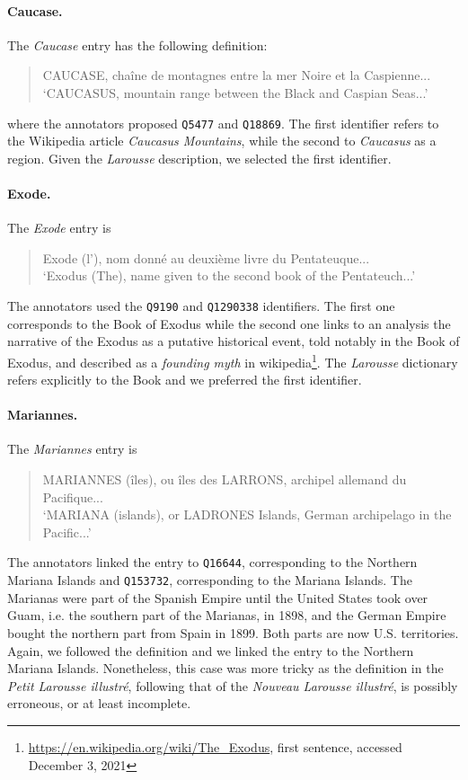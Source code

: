 \documentclass[10pt, a4paper]{article}
\begin{document}
\paragraph{Caucase.} The \textit{Caucase} entry has the following definition:
\begin{quote}
CAUCASE, chaîne de montagnes entre la mer Noire et la Caspienne...\\
`CAUCASUS, mountain range between the Black and Caspian Seas...'
\end{quote}
where the annotators proposed \verb=Q5477= and \verb=Q18869=. The first identifier refers to the Wikipedia article \textit{Caucasus Mountains}, while the second to \textit{Caucasus} as a region. Given the \textit{Larousse} description, we selected the first identifier.

\paragraph{Exode.} The \textit{Exode} entry is
\begin{quote}
Exode (l'), nom donné au deuxième livre du Pentateuque...\\
`Exodus (The), name given to the second book of the Pentateuch...'
\end{quote}
The annotators used the \verb=Q9190= and \verb=Q1290338= identifiers. The first one corresponds to the Book of Exodus while the second one links to an analysis the narrative of the Exodus as a putative historical event, told notably in the Book of Exodus, and described as a \textit{founding myth} in wikipedia\footnote{\url{https://en.wikipedia.org/wiki/The_Exodus}, first sentence, accessed December 3, 2021}. The \textit{Larousse} dictionary refers explicitly to the Book and we preferred the first identifier.

\paragraph{Mariannes.} The \textit{Mariannes} entry is
\begin{quote}
MARIANNES (îles), ou îles des LARRONS, archipel allemand du Pacifique...\\
`MARIANA (islands), or LADRONES Islands, German archipelago in the Pacific...' 
\end{quote}
The annotators linked the entry to \verb=Q16644=, corresponding to the Northern Mariana Islands and \verb=Q153732=, corresponding to the Mariana Islands. The Marianas were part of the Spanish Empire until the United States took over Guam, i.e. the southern part of the Marianas, in 1898, and the German Empire bought the northern part from Spain in 1899. Both parts are now U.S. territories. Again, we followed the definition and we linked the entry to the Northern Mariana Islands. Nonetheless, this case was more tricky as the definition in the \textit{Petit Larousse illustré}, following that of the \textit{Nouveau Larousse illustré}, is possibly erroneous, or at least incomplete.
\end{document}
